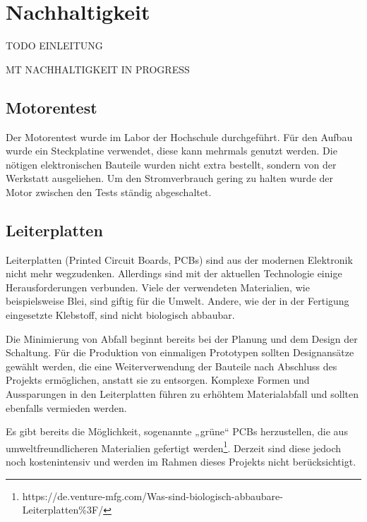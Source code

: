 \section{Nachhaltigkeit}
\label{section:Nachhaltigkeit}

TODO EINLEITUNG 


MT NACHHALTIGKEIT IN PROGRESS


\subsection{Motorentest}

Der Motorentest wurde im Labor der Hochschule durchgeführt. Für den Aufbau wurde ein Steckplatine verwendet, diese kann mehrmals genutzt werden. Die nötigen elektronischen Bauteile wurden nicht extra bestellt, sondern von der Werkstatt ausgeliehen. Um den Stromverbrauch gering zu halten wurde der Motor zwischen den Tests ständig abgeschaltet. 

\subsection{Leiterplatten}
\label{Leiterplatten}

Leiterplatten (Printed Circuit Boards, PCBs) sind aus der modernen Elektronik nicht mehr wegzudenken. Allerdings sind mit der aktuellen Technologie einige Herausforderungen verbunden. Viele der verwendeten Materialien, wie beispielsweise Blei, sind giftig für die Umwelt. Andere, wie der in der Fertigung eingesetzte Klebstoff, sind nicht biologisch abbaubar.

Die Minimierung von Abfall beginnt bereits bei der Planung und dem Design der Schaltung. Für die Produktion von einmaligen Prototypen sollten Designansätze gewählt werden, die eine Weiterverwendung der Bauteile nach Abschluss des Projekts ermöglichen, anstatt sie zu entsorgen. Komplexe Formen und Aussparungen in den Leiterplatten führen zu erhöhtem Materialabfall und sollten ebenfalls vermieden werden.

Es gibt bereits die Möglichkeit, sogenannte „grüne“ PCBs herzustellen, die aus umweltfreundlicheren Materialien gefertigt werden\footnote{https://de.venture-mfg.com/Was-sind-biologisch-abbaubare-Leiterplatten\%3F/}.  Derzeit sind diese jedoch noch kostenintensiv und werden im Rahmen dieses Projekts nicht berücksichtigt.

